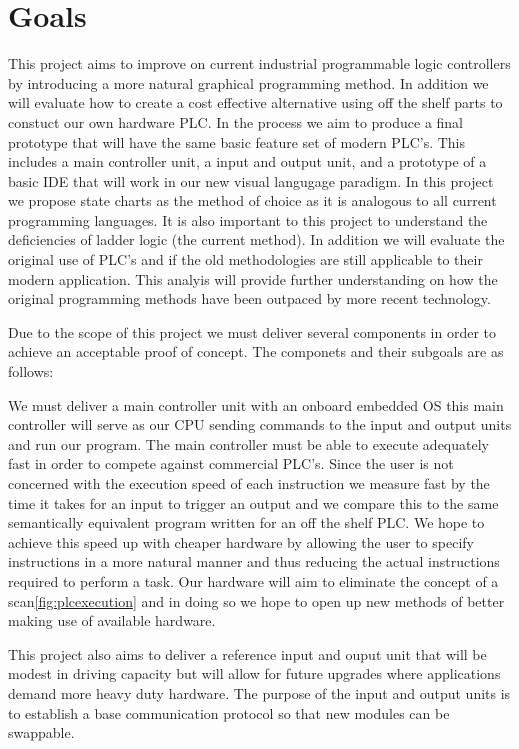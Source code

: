 \section{Goals}

This project aims to improve on current industrial programmable logic controllers by introducing a more natural graphical programming method. In addition we will evaluate how to create a cost effective alternative using off the shelf parts to constuct our own hardware PLC. In the process we aim to produce a final prototype that will have the same basic feature set of modern PLC's. This includes a main controller unit, a input and output unit, and a prototype of a basic IDE that will work in our new visual langugage paradigm. In this project we propose state charts as the method of choice as it is analogous to all current programming languages. It is also important to this project to understand the deficiencies of ladder logic (the current method). In addition we will evaluate the original use of PLC's and if the old methodologies are still applicable to their modern application. This analyis will provide further understanding on how the original programming methods have been outpaced by more recent technology.

Due to the scope of this project we must deliver several components in order to achieve an acceptable proof of concept. The componets and their subgoals are as follows:

We must deliver a main controller unit with an onboard embedded OS this main controller will serve as our CPU sending commands to the input and output units and run our program. The main controller must be able to execute adequately fast in order to compete against commercial PLC's. Since the user is not concerned with the execution speed of each instruction we measure fast by the time it takes for an input to trigger an output and we compare this to the same semantically equivalent program written for an off the shelf PLC. We hope to achieve this speed up with cheaper hardware by allowing the user to specify instructions in a more natural manner and thus reducing the actual instructions required to perform a task. Our hardware will aim to eliminate the concept of a scan\ref{fig:plcexecution} and in doing so we hope to open up new methods of better making use of available hardware.

This project also aims to deliver a reference input and ouput unit that will be modest in driving capacity but will allow for future upgrades where applications demand more heavy duty hardware. The purpose of the input and output units is to establish a base communication protocol so that new modules can be swappable.

